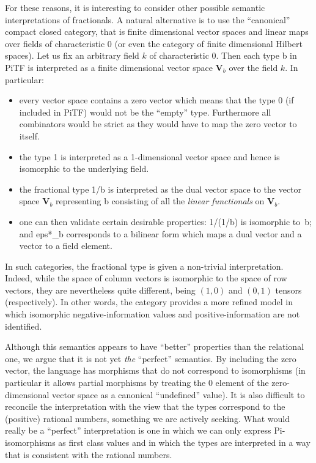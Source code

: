 \documentclass{llncs}
\begin{document}
For these reasons, it is interesting to consider other possible semantic
interpretations of fractionals. A natural alternative is to use the
``canonical'' compact closed category, that is finite dimensional vector
spaces and linear
maps~\cite{Selinger:2011:FDH:1942319.1942398,hasegawa2008finite}
over fields of characteristic $0$ (or even the category of finite dimensional
Hilbert spaces). Let us fix an arbitrary field $k$ of characteristic $0$.
Then each type {{b}} in {{PiTF}} is interpreted as a finite dimensional
vector space $\mathbf{V}_b$ over the field $k$. In particular:
\begin{itemize}
  \item every vector space contains a zero vector which means that the type
    {{0}} (if included in {{PiTF}}) would not be the ``empty'' type.
    Furthermore all combinators would be
    strict as they would have to map the zero vector to itself. 
  \item the type {{1}} is interpreted as a 1-dimensional vector space and hence
    is isomorphic to the underlying field.
  \item the fractional type {{1/b}} is interpreted as the dual vector space
    to the vector space $\mathbf{V}_b$ representing {{b}} consisting of all
    the \emph{linear functionals} on $\mathbf{V}_b$.
  \item one can then validate certain desirable properties: {{1/(1/b)}} is
    isomorphic to~{{b}}; and {{eps*_b}} corresponds to a bilinear form which
    maps a dual vector and a vector to a field element.
\end{itemize}
In such categories, the fractional type is given a non-trivial
interpretation. Indeed, while the space of column vectors is isomorphic to
the space of row vectors, they are nevertheless quite different, being
$(1,0)$ and $(0,1)$ tensors (respectively).  In other words, the category
provides a more refined model in which isomorphic negative-information values
and positive-information are not identified.

Although this semantics appears to have ``better'' properties than the
relational one, we argue that it is not yet \emph{the} ``perfect''
semantics. By including the zero vector, the language has morphisms that do
not correspond to isomorphisms (in particular it allows partial morphisms by
treating the {{0}} element of the zero-dimensional vector space as a
canonical ``undefined'' value).  It is also difficult to reconcile the
interpretation with the view that the types correspond to the (positive)
rational numbers, something we are actively seeking. What would really be a
``perfect'' interpretation is one in which we can only express
{{Pi}}-isomorphisms as first class values and in which the types are
interpreted in a way that is consistent with the rational numbers.
\end{document}
